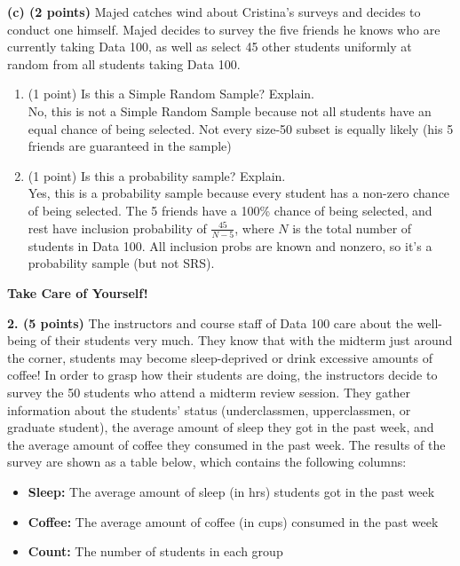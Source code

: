 \documentclass[11pt]{article}
\begin{document}
\medskip
\textbf{(c) (2 points)} Majed catches wind about Cristina’s surveys and decides to conduct one himself. Majed decides to survey the five friends he knows who are currently taking Data 100, as well as select 45 other students uniformly at random from all students taking Data 100.
\begin{enumerate}[label=\roman*.]
    \item (1 point) Is this a Simple Random Sample? Explain.
    \smallskip
    \\No, this is not a Simple Random Sample because not all students have an 
    equal chance of being selected. Not every size-50 subset is 
    equally likely (his 5 friends are guaranteed in the sample)
    \item (1 point) Is this a probability sample? Explain.
    \smallskip\\
    Yes, this is a probability sample because every student has a
    non-zero chance of being selected. The 5 friends have a 100\% chance 
    of being selected, and rest have inclusion probability of $\frac{45}{N-5}$, 
    where $N$ is the total number of students in Data 100. 
    All inclusion probs are known and nonzero, so it’s a probability 
    sample (but not SRS).
\end{enumerate}

\newpage

\noindent\textbf{\LARGE Take Care of Yourself!}
\medskip

\noindent \textbf{2. (5 points)} The instructors and course staff of Data 100 care about the well-being of their students very much. They know that with the midterm just around the corner, students may become sleep-deprived or drink excessive amounts of coffee! In order to grasp how their students are doing, the instructors decide to survey the 50 students who attend a midterm review session. They gather information about the students’ status (underclassmen, upperclassmen, or graduate student), the average amount of sleep they got in the past week, and the average amount of coffee they consumed in the past week. The results of the survey are shown as a table below, which contains the following columns:
\begin{itemize} [leftmargin=4em]
    \item \textbf{Sleep:} The average amount of sleep (in hrs) students got in the past week
    \item \textbf{Coffee:} The average amount of coffee (in cups) consumed in the past week
    \item \textbf{Count:} The number of students in each group
\end{itemize}
\end{document}
